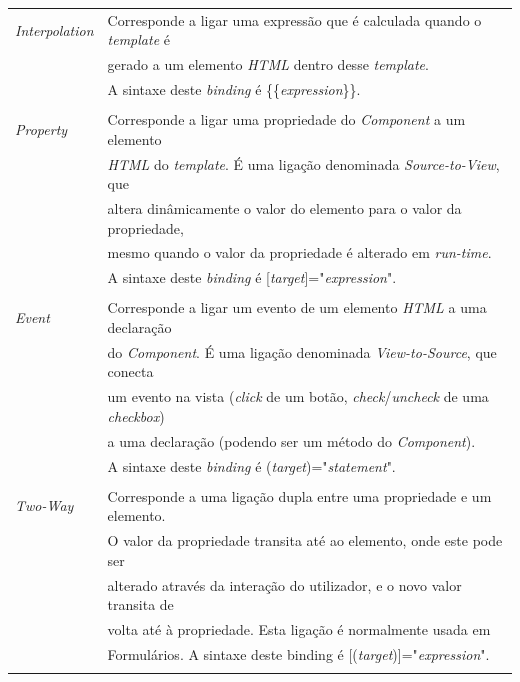 \begin{tabular}{ll}
	\emph{Interpolation} & Corresponde a ligar uma expressão que é calculada quando o \textit{template} é \\
	& gerado a um elemento \textit{HTML} dentro desse \textit{template}. \\
	& A sintaxe deste \textit{binding} é {\{\{\textit{expression}\}\}}. \\
	\\
	\emph{Property} & Corresponde a ligar uma propriedade do \textit{Component} a um elemento \\
	&\textit{HTML} do \textit{template}. É uma ligação denominada \textit{Source-to-View}, que \\
	& altera dinâmicamente o valor do elemento para o valor da propriedade,\\
	& mesmo quando o valor da propriedade é alterado em \textit{run-time}. \\
	& A sintaxe deste \textit{binding} é [\textit{target}]="\textit{expression}".\\
	\\
	\emph{Event} & Corresponde a ligar um evento de um elemento \textit{HTML} a uma declaração \\
	&do \textit{Component}. É uma ligação denominada \textit{View-to-Source}, que conecta \\
	&um evento na vista (\textit{click} de um botão, \textit{check}/\textit{uncheck} de uma \textit{checkbox})\\
	& a uma declaração (podendo ser um método do \textit{Component}). \\
	& A sintaxe deste \textit{binding} é (\textit{target})="\textit{statement}".\\
	\\
	\emph{Two-Way} & Corresponde a uma ligação dupla entre uma propriedade e um elemento. \\
	& O valor da propriedade transita até ao elemento, onde este pode ser \\
	&alterado através da interação do utilizador, e o novo valor transita de \\
	&volta até à propriedade. Esta ligação é normalmente usada em\\
	& Formulários. A sintaxe deste binding é [(\textit{target})]="\textit{expression}".\\
	\\
\end{tabular}

\newpage

